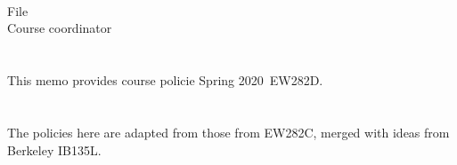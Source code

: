 \documentclass[11pt,courier]{navymemo}
\newcommand{\usnaCourseNumber}{EW282D}
\newcommand{\usnaCourseTerm}{Spring 2020}
\begin{document}
\noclosing{}\\
\noindent\hspace*{4in}
\signature{D Evangelista}

\noindent\hspace*{4in}{207 Maury Hall}\\
\hspace*{4in}{(410) 293-6132}\\






\copyto{}
File\\
Course coordinator


\navyrecordnote
\thispagestyle{empty}

%

\navyrecordnotesubjline

\section{}  This memo provides course policie \usnaCourseTerm\ \usnaCourseNumber.

\section{}  The policies here are adapted from those from EW282C, merged with ideas from Berkeley IB135L.

\end{document}
